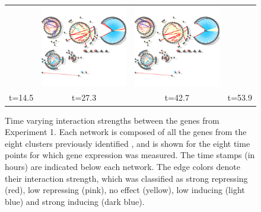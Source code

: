\documentclass{bioinfo}
\begin{document}
\begin{figure}[htp]
\begin{tabular}{cccc}
  &   \includegraphics[scale=0.3]{results/aejoint/t7.png}
  &   \includegraphics[scale=0.3]{results/aejoint/t8.png}  \\
  t=14.5 & t=27.3 & t=42.7 & t=53.9 \\ 
  \end{tabular}
  \caption{Time varying interaction strengths between the genes from Experiment 1. Each network is composed of all the genes from the eight clusters previously identified \citep{Farzadfard2010}, and is shown for the eight time points for which gene expression was measured. The time stamps (in hours) are indicated below each network. 
The edge colors denote their interaction strength, which was classified as strong repressing (red), low repressing (pink), no effect (yellow), low inducing (light blue) and strong inducing (dark blue).}
  \label{fig:exp-1-time-evol}
\end{figure}
 
\end{document}
